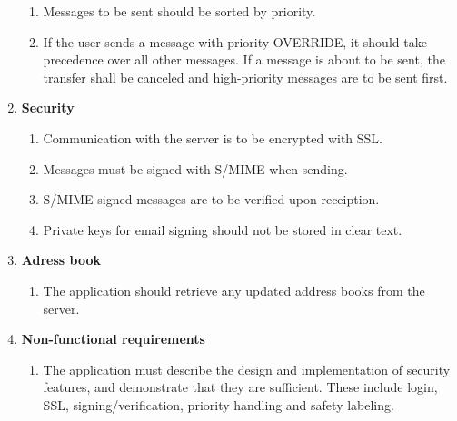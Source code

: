 \begin{enumerate}
\begin{enumerate}
\item{}Messages to be sent should be sorted by priority.
\item{}If the user sends a message with priority OVERRIDE, it should take precedence over all other messages. If a message is about to be sent, the transfer shall be canceled and high-priority messages are to be sent first.
\end{enumerate}
\item{}\textbf{Security}
\begin{enumerate}
\item{}Communication with the server is to be encrypted with SSL.
\item{}Messages must be signed with S/MIME when sending.
\item{}S/MIME-signed messages are to be verified upon receiption.
\item{}Private keys for email signing should not be stored in clear text.
\end{enumerate}

\newpage

\item{}\textbf{Adress book}
\begin{enumerate}
\item{}The application should retrieve any updated address books from the server.
\end{enumerate}
\item{}\textbf{Non-functional requirements}
\begin{enumerate}
\item{}The application must describe the design and implementation of security features, and demonstrate that they are sufficient. These include login, SSL, signing/verification, priority handling and safety labeling.
\end{enumerate}
\end{enumerate}